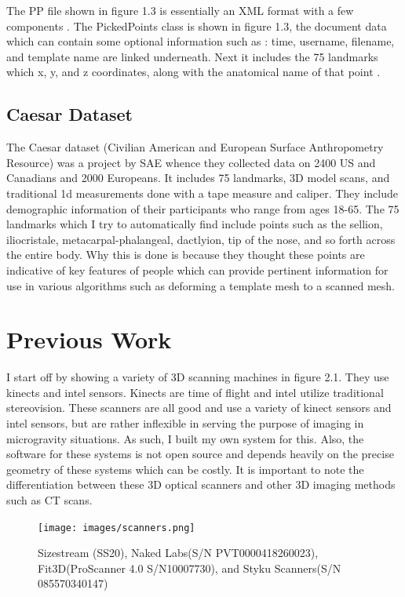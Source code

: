 The PP file shown in figure 1.3 is essentially an XML format with a few components \cite{bray2000extensible}. The PickedPoints class is shown in figure 1.3, the document data which can contain some optional information such as : time, username, filename, and template name are linked underneath. Next it includes the 75 landmarks which x, y, and z coordinates, along with the anatomical name of that point \cite{robinette2002civilian}.

\section{Caesar Dataset}
The Caesar dataset (Civilian American and European Surface Anthropometry Resource) was a project by SAE whence they collected data on 2400 US and Canadians and 2000 Europeans. It includes 75 landmarks, 3D model scans, and traditional 1d measurements done with a tape measure and caliper. They include demographic information of their participants who range from ages 18-65. The 75 landmarks which I try to automatically find include points such as the sellion, iliocristale, metacarpal-phalangeal, dactlyion, tip of the nose, and so forth across the entire body. Why this is done is because they thought these points are indicative of key features of people which can provide pertinent information for use in various algorithms such as deforming a template mesh to a scanned mesh.

\chapter{Previous Work}
I start off by showing a variety of 3D scanning machines in figure 2.1. They use kinects and intel sensors. Kinects are time of flight and intel utilize traditional stereovision.
These scanners are all good and use a variety of kinect sensors and intel sensors, but are rather inflexible in serving the purpose of imaging in microgravity situations. As such, I built my own system for this. Also, the software for these systems is not open source and depends heavily on the precise geometry of these systems which can be costly. It is important to note the differentiation between these 3D optical scanners and other 3D imaging methods such as CT scans.

\begin{figure}[!htb]
	\caption{Sizestream (SS20), Naked Labs(S/N PVT0000418260023), Fit3D(ProScanner 4.0 S/N10007730), and Styku Scanners(S/N 085570340147)}
	\centering
	\texttt{[image: images/scanners.png]}
\end{figure}

